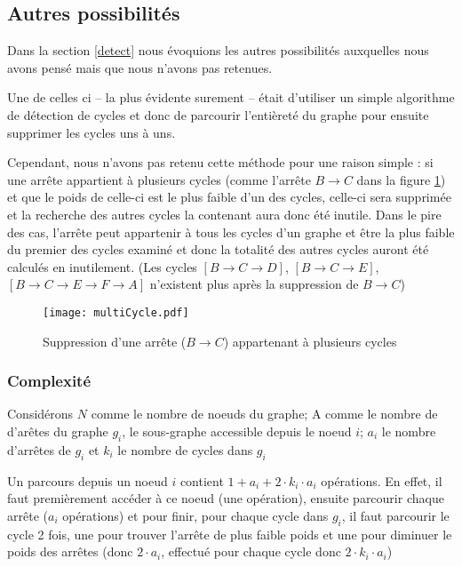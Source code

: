 \documentclass[12pt, oneside]{article}
\begin{document}
\subsection{Autres possibilités}
\label{others}

Dans la section \ref{detect} nous évoquions les autres possibilités auxquelles nous avons pensé mais que nous n'avons pas retenues. 

Une de celles ci -- la plus évidente surement -- était d'utiliser un simple algorithme de détection de cycles et donc de parcourir l'entièreté du graphe pour ensuite supprimer les cycles uns à uns.

Cependant, nous n'avons pas retenu cette méthode pour une raison simple : si une arrête appartient à plusieurs cycles (comme l'arrête $B \rightarrow C$ dans la figure \ref{multiCycle}) et que le poids de celle-ci est le plus faible d'un des cycles, celle-ci sera supprimée et la recherche des autres cycles la contenant aura donc été inutile. Dans le pire des cas, l'arrête peut appartenir à tous les cycles d'un graphe et être la plus faible du premier des cycles examiné et donc la totalité des autres cycles auront été calculés en inutilement. (Les cycles $[B \rightarrow C \rightarrow D]$, $[B \rightarrow C \rightarrow E]$, $[B \rightarrow C \rightarrow E \rightarrow F \rightarrow A]$ n'existent plus après la suppression de $B \rightarrow C$)
\begin{figure}[h]
    \caption{\label{multiCycle} Suppression d'une arrête ($B \rightarrow C$) appartenant à plusieurs cycles}
    \center
    \texttt{[image: multiCycle.pdf]}
\end{figure}


\subsubsection{Complexité}

Considérons $N$ comme le nombre de noeuds du graphe; A comme le nombre de d'arêtes du graphe $g_{i}$, le sous-graphe accessible depuis le noeud $i$; $a_{i}$ le nombre d'arrêtes de $g_{i}$ et $k_{i}$ le nombre de cycles dans $g_{i}$

Un parcours depuis un noeud $i$ contient $1 + a_{i} + 2\cdot k_{i} \cdot a_{i}$ opérations. En effet, il faut premièrement accéder à ce noeud (une opération), ensuite parcourir chaque arrête ($a_{i}$ opérations) et pour finir, pour chaque cycle dans $g_{i}$, il faut parcourir le cycle 2 fois, une pour trouver l'arrête de plus faible poids et une pour diminuer le poids des arrêtes (donc $2 \cdot a_{i} $, effectué pour chaque cycle donc $2\cdot k_{i} \cdot a_{i}$)
\end{document}
